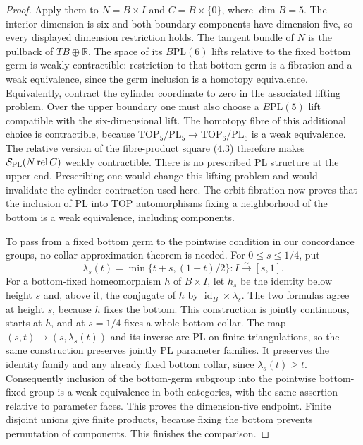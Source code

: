 \documentclass[11pt,a4paper]{article}
\theoremstyle{definition}
\begin{document}
\begin{proof}
Apply them to $N=B\times I$ and $C=B\times\{0\}$, where
$\dim B=5$. The interior dimension is six and both boundary components
have dimension five, so every displayed dimension restriction holds.
The tangent bundle of $N$ is the pullback of $TB\oplus\mathbb R$.
The space of its $B\mathrm{PL}(6)$ lifts relative to the fixed bottom
germ is weakly contractible: restriction to that bottom germ is a
fibration and a weak equivalence, since the germ inclusion is a
homotopy equivalence. Equivalently, contract the cylinder coordinate
to zero in the associated lifting problem. Over the upper boundary
one must also choose a $B\mathrm{PL}(5)$ lift compatible with the
six-dimensional lift. The homotopy fibre of this additional choice is
contractible, because
$\mathrm{TOP}_5/\mathrm{PL}_5\to\mathrm{TOP}_6/\mathrm{PL}_6$
is a weak equivalence. The relative version of the fibre-product
square (4.3) therefore makes
$\mathcal S_{\rm PL}(N\operatorname{rel} C)$ weakly contractible.
There is no prescribed PL structure at the upper end. Prescribing
one would change this lifting problem and would invalidate the
cylinder contraction used here. The orbit fibration now proves that
the inclusion of PL into TOP automorphisms fixing a neighborhood of
the bottom is a weak equivalence, including components.

To pass from a fixed bottom germ to the pointwise condition in our
concordance groups, no collar approximation theorem is needed. For
$0\le s\le1/4$, put
\[
 \lambda_s(t)=\min\{t+s,(1+t)/2\}:I\xrightarrow{\sim}[s,1].
\]
For a bottom-fixed homeomorphism $h$ of $B\times I$, let $h_s$ be
the identity below height $s$ and, above it, the conjugate of $h$ by
$\operatorname{id}_B\times\lambda_s$. The two formulas agree at height
$s$, because $h$ fixes the bottom. This construction is jointly
continuous, starts at $h$, and at $s=1/4$ fixes a whole bottom collar.
The map $(s,t)\mapsto(s,\lambda_s(t))$ and its inverse are PL on finite
triangulations, so the same construction preserves jointly PL
parameter families. It preserves the identity family and any already
fixed bottom collar, since $\lambda_s(t)\ge t$. Consequently inclusion
of the bottom-germ subgroup into the pointwise bottom-fixed group
is a weak equivalence in both categories, with the same assertion
relative to parameter faces. This proves the dimension-five endpoint.
Finite disjoint unions give finite products, because fixing the bottom
prevents permutation of components. This finishes the comparison.

\end{proof}
\end{document}
